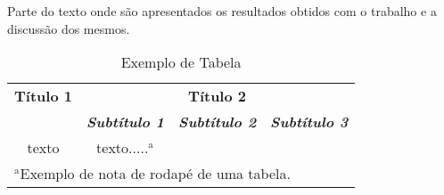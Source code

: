 Parte do texto onde são apresentados os resultados obtidos com o trabalho e a discussão dos mesmos.
\begin{table}[htbp]
\caption{Exemplo de Tabela}
\begin{center}
\begin{tabular}{|c|c|c|c|}
\hline
\textbf{Título 1}&\multicolumn{3}{|c|}{\textbf{Título 2}} \\
\cline{2-4} 
\textbf{} & \textbf{\textit{Subtítulo 1}}& \textbf{\textit{Subtítulo 2}}& \textbf{\textit{Subtítulo 3}} \\
\hline
texto& texto.....$^{\mathrm{a}}$& &  \\
\hline
\multicolumn{4}{l}{$^{\mathrm{a}}$Exemplo de nota de rodapé de uma tabela.}
\end{tabular}
\label{tab1}
\end{center}
\end{table}